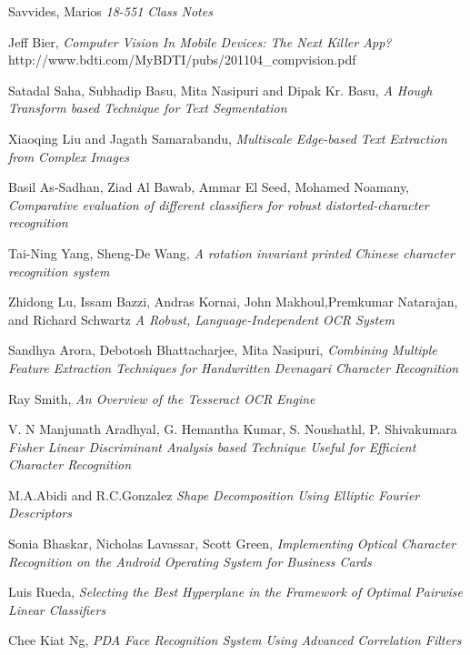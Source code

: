 \begin{thebibliography}{99}

  Savvides, Marios
  \textit{18-551 Class Notes}

  Jeff Bier,
  \textit{Computer Vision In Mobile Devices: The Next Killer App?}
  http://www.bdti.com/MyBDTI/pubs/201104\_compvision.pdf
  
  Satadal Saha, Subhadip Basu, Mita Nasipuri and Dipak Kr. Basu,
  \textit{A Hough Transform based Technique for Text Segmentation}
  
  Xiaoqing Liu and Jagath Samarabandu,
  \textit{Multiscale Edge-based Text Extraction from Complex Images}
  
  Basil As-Sadhan, Ziad Al Bawab, Ammar El Seed, Mohamed Noamany,
  \textit{Comparative evaluation of different classifiers for robust distorted-character recognition}
  
  Tai-Ning Yang, Sheng-De Wang,
  \textit{A rotation invariant printed Chinese character recognition system}
  
  Zhidong Lu, Issam Bazzi, Andras Kornai, John Makhoul,Premkumar Natarajan, and Richard Schwartz
  \textit{A Robust, Language-Independent OCR System}
  
  Sandhya Arora, Debotosh Bhattacharjee, Mita Nasipuri, 
  \textit{Combining Multiple Feature Extraction Techniques for Handwritten Devnagari Character Recognition}
  
  Ray Smith, 
  \textit{An Overview of the Tesseract OCR Engine}
  
  V. N Manjunath Aradhyal, G. Hemantha Kumar, S. Noushathl, P. Shivakumara
  \textit{Fisher Linear Discriminant Analysis based Technique Useful for Efficient Character Recognition}
  
  M.A.Abidi and R.C.Gonzalez
  \textit{Shape Decomposition Using Elliptic Fourier Descriptors}
  
  Sonia Bhaskar, Nicholas Lavassar, Scott Green, 
  \textit{Implementing Optical Character Recognition on the Android Operating System for Business Cards}
  
  Luis Rueda,
  \textit{Selecting the Best Hyperplane in the Framework of Optimal Pairwise Linear Classifiers}

  Chee Kiat Ng,
  \textit{PDA Face Recognition System Using Advanced Correlation Filters}
  

\end{thebibliography}
